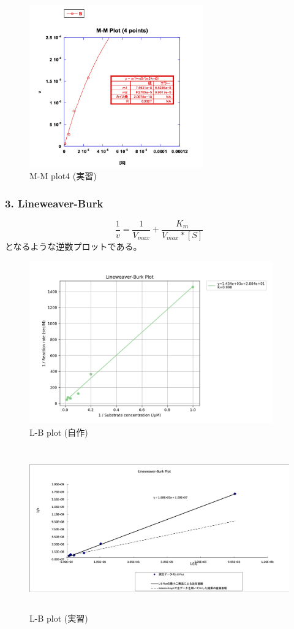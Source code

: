 \documentclass[a4paper,papersize,dvipdfmx]{jsarticle}
\begin{document}
\begin{figure}[H]
\begin{center}
\includegraphics[clip, height=7cm]{imgs/11-mm4.png}
\caption{M-M plot4 (実習)}
\end{center}
\end{figure}


\subsubsection*{3. Lineweaver-Burk}
\[\frac{1}{v} = \frac{1}{V_{max}}+\frac{K_m}{V_{max}*[S]}\]
となるような逆数プロットである。

\begin{figure}[H]
\begin{center}
\includegraphics[clip, height=7cm]{imgs/Lineweaver-Burk.png}
\caption{L-B plot (自作)}
\end{center}
\end{figure}

\begin{figure}[H]
\begin{center}
\includegraphics[clip, height=7cm]{imgs/11-lb.png}
\caption{L-B plot (実習)}
\end{center}
\end{figure}
\end{document}
